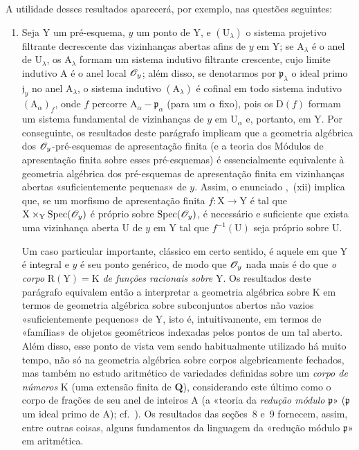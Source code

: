 \begin{env}[8.1.2]
\label{IV.8.1.2}
A utilidade desses resultados aparecerá, por exemplo, nas questões seguintes:
\begin{enumerate}[label=\emph{\alph*)}]
  \item
  Seja $\mathrm{Y}$ um pré-esquema, $y$ um ponto de $\mathrm{Y}$, e $(\mathrm{U}_\lambda)$ o sistema projetivo filtrante decrescente das vizinhanças abertas afins de $y$ em $\mathrm{Y}$; se $\mathrm{A}_\lambda$ é o anel de $\mathrm{U}_\lambda$, os $\mathrm{A}_\lambda$ formam um sistema indutivo filtrante crescente, cujo limite indutivo $\mathrm{A}$ é o anel local $\mathscr{O}_y$; além disso, se denotarmos por $\mathfrak{p}_\lambda$ o ideal primo $\mathfrak{j}_y$ no anel $\mathrm{A}_\lambda$, o sistema indutivo $(\mathrm{A}_\lambda)$ é cofinal em todo sistema indutivo $(\mathrm{A}_\alpha)_f$, onde $f$ percorre $\mathrm{A}_\alpha-\mathfrak{p}_\alpha$
(para um $\alpha$ fixo), pois os $\mathrm{D}(f)$ formam um sistema fundamental de vizinhanças de $y$ em $\mathrm{U}_\alpha$ e, portanto, em $\mathrm{Y}$.
Por conseguinte, os resultados deste parágrafo implicam que a geometria algébrica dos $\mathscr{O}_y$-pré-esquemas de apresentação finita (e a teoria dos Módulos de apresentação finita sobre esses pré-esquemas) é essencialmente equivalente à geometria algébrica dos pré-esquemas de apresentação finita em vizinhanças abertas «suficientemente pequenas» de $y$.
Assim, o enunciado ,~(xii) implica que, se um morfismo de apresentação finita $f:\mathrm{X}\to\mathrm{Y}$ é tal que $\mathrm{X}\times_\mathrm{Y}\operatorname{Spec}(\mathscr{O}_y)$ é próprio sobre $\operatorname{Spec}(\mathscr{O}_y)$, é necessário e suficiente que exista uma vizinhança aberta $\mathrm{U}$ de $y$ em $\mathrm{Y}$ tal que $f^{-1}(\mathrm{U})$ seja próprio sobre $\mathrm{U}$.

Um caso particular importante, clássico em certo sentido, é aquele em que $\mathrm{Y}$ é integral e $y$ é seu ponto genérico, de modo que $\mathscr{O}_y$ nada mais é do que \emph{o corpo} $\mathrm{R}(\mathrm{Y})=\mathrm{K}$ \emph{de funções racionais sobre} $\mathrm{Y}$.
Os resultados deste parágrafo equivalem então a interpretar a geometria algébrica sobre $\mathrm{K}$ em termos de geometria algébrica sobre subconjuntos abertos não vazios «suficientemente pequenos» de $\mathrm{Y}$, isto é, intuitivamente, em termos de «famílias» de objetos geométricos indexadas pelos pontos de um tal aberto.
Além disso, esse ponto de vista vem sendo habitualmente utilizado há muito tempo, não só na geometria algébrica sobre corpos algebricamente fechados, mas também no estudo aritmético de variedades definidas sobre um \emph{corpo de números} $\mathrm{K}$ (uma extensão finita de $\mathbf{Q}$), considerando este último como o corpo de frações de seu anel de inteiros $\mathrm{A}$ (a «teoria da \emph{redução módulo} $\mathfrak{p}$» ($\mathfrak{p}$ um ideal primo de $\mathrm{A}$); cf.\ ).
Os resultados das seções \textsection\textsection\,8 e~9 fornecem, assim, entre outras coisas, alguns fundamentos da linguagem da «redução módulo $\mathfrak{p}$» em aritmética.


\end{enumerate}
\end{env}
